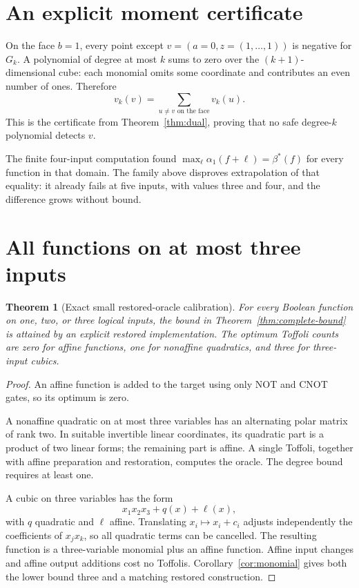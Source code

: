 \documentclass[11pt,letterpaper,oneside]{report}
\theoremstyle{komorebi}
\newtheorem{theorem}{Theorem}[chapter]
\begin{document}
\section{An explicit moment certificate}
On the face $b=1$, every point except $v=(a=0,z=(1,\ldots,1))$ is negative for $G_k$. A polynomial of degree at most $k$ sums to zero over the $(k+1)$-dimensional cube: each monomial omits some coordinate and contributes an even number of ones. Therefore
\[
 v_k(v)=\sum_{u\ne v\text{ on the face}}v_k(u).
\]
This is the certificate from Theorem~\ref{thm:dual}, proving that no safe degree-$k$ polynomial detects $v$.

The finite four-input computation found $\max_\ell\alpha_1(f+\ell)=\beta^*(f)$ for every function in that domain. The family above disproves extrapolation of that equality: it already fails at five inputs, with values three and four, and the difference grows without bound.

\section{All functions on at most three inputs}
\begin{theorem}[Exact small restored-oracle calibration]\label{thm:small-oracles}
For every Boolean function on one, two, or three logical inputs, the bound in Theorem~\ref{thm:complete-bound} is attained by an explicit restored implementation. The optimum Toffoli counts are zero for affine functions, one for nonaffine quadratics, and three for three-input cubics.
\end{theorem}
\begin{proof}
An affine function is added to the target using only NOT and CNOT gates, so its optimum is zero.

A nonaffine quadratic on at most three variables has an alternating polar matrix of rank two. In suitable invertible linear coordinates, its quadratic part is a product of two linear forms; the remaining part is affine. A single Toffoli, together with affine preparation and restoration, computes the oracle. The degree bound requires at least one.

A cubic on three variables has the form
\[
 x_1x_2x_3+q(x)+\ell(x),
\]
with $q$ quadratic and $\ell$ affine. Translating $x_i\mapsto x_i+c_i$ adjusts independently the coefficients of $x_jx_k$, so all quadratic terms can be cancelled. The resulting function is a three-variable monomial plus an affine function. Affine input changes and affine output additions cost no Toffolis. Corollary~\ref{cor:monomial} gives both the lower bound three and a matching restored construction.
\end{proof}
\end{document}
